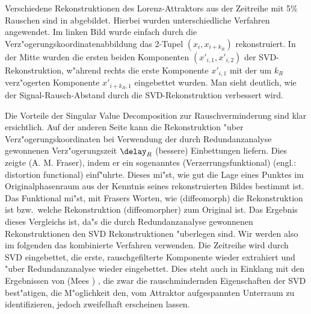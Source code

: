 Verschiedene Rekonstruktionen des Lorenz-Attraktors aus der Zeitreihe mit 5\% Rauschen sind
in  abgebildet. Hierbei wurden unterschiedliche Verfahren angewendet.
Im linken Bild wurde einfach durch die Verz"ogerungskoordinatenabbildung das 2-Tupel
$(x_i,x_{i+k_R})$ rekonstruiert. In der Mitte wurden die ersten beiden Komponenten
$(x'_{i,1},x'_{i,2})$ der SVD-Rekonstruktion, w"ahrend rechts die erste Komponente
$x'_{i,1}$ mit der um $k_R$ verz"ogerten Komponente $x'_{i+k_R,1}$ eingebettet wurden.
Man sieht deutlich, wie der Signal-Rausch-Abstand durch die SVD-Rekonstruktion verbessert
wird.


Die Vorteile der Singular Value Decomposition zur Rauschverminderung sind klar
ersichtlich. Auf der anderen Seite kann die Rekonstruktion "uber Verz"ogerungskoordinaten
bei Verwendung der durch Redundanzanalyse gewonnenen Verz"ogerungszeit $\delay_R$
\naja(bessere) Einbettungen liefern. Dies zeigte \autor(A. M. Fraser), indem er ein
sogenanntes \begriff(Verzerrungsfunktional) (engl.: distortion functional)
einf"uhrte. Dieses mi"st, wie gut die Lage eines Punktes im Originalphasenraum aus der
Kenntnis seines rekonstruierten Bildes bestimmt ist\cite{Fraser}. Das Funktional mi"st,
mit Frasers Worten, wie \naja(diffeomorph) die Rekonstruktion ist bzw.\  welche
Rekonstruktion \naja(diffeomorpher) zum Original ist. Das Ergebnis dieses Vergleichs ist,
da"s die durch Redundanzanalyse gewonnenen Rekonstruktionen den SVD Rekonstruktionen
"uberlegen sind. Wir werden also im folgenden das kombinierte Verfahren verwenden. Die
Zeitreihe wird durch SVD eingebettet, die erste, rauschgefilterte Komponente wieder
extrahiert und "uber Redundanzanalyse wieder eingebettet. Dies steht auch in Einklang mit
den Ergebnissen von \autor(Mees \etal) , die zwar die rauschmindernden
Eigenschaften der SVD best"atigen, die M"oglichkeit den, vom Attraktor aufgespannten
Unterraum zu identifizieren, jedoch zweifelhaft erscheinen lassen\cite{Mees87}.












